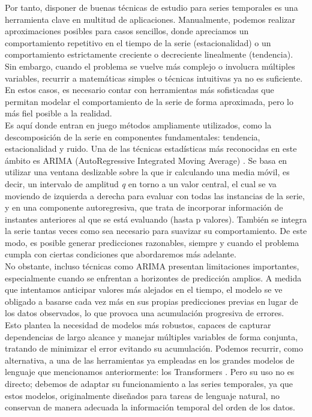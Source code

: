 Por tanto, disponer de buenas técnicas de estudio para series temporales es una herramienta clave en multitud de aplicaciones. Manualmente, podemos realizar aproximaciones posibles para casos sencillos, donde apreciamos un comportamiento repetitivo en el tiempo de la serie (estacionalidad) o un comportamiento estrictamente creciente o decreciente linealmente (tendencia). Sin embargo, cuando el problema se vuelve más complejo o involucra múltiples variables, recurrir a matemáticas simples o técnicas intuitivas ya no es suficiente. En estos casos, es necesario contar con herramientas más sofisticadas que permitan modelar el comportamiento de la serie de forma aproximada, pero lo más fiel posible a la realidad.\\

Es aquí donde entran en juego métodos ampliamente utilizados, como la descomposición de la serie en componentes fundamentales: tendencia, estacionalidad y ruido. Una de las técnicas estadísticas más reconocidas en este ámbito es ARIMA (AutoRegressive Integrated Moving Average) \cite{10.5555/574978}. Se basa en utilizar una ventana deslizable sobre la que ir calculando una media móvil, es decir, un intervalo de amplitud \textit{q} en torno a un valor central, el cual se va moviendo de izquierda a derecha para evaluar con todas las instancias de la serie, y en una componente autoregresiva, que trata de incorporar información de instantes anteriores al que se está evaluando (hasta p valores). También se integra la serie tantas veces como sea necesario para suavizar su comportamiento. De este modo, es posible generar predicciones razonables, siempre y cuando el problema cumpla con ciertas condiciones que abordaremos más adelante.\\

No obstante, incluso técnicas como ARIMA presentan limitaciones importantes, especialmente cuando se enfrentan a horizontes de predicción amplios. A medida que intentamos anticipar valores más alejados en el tiempo, el modelo se ve obligado a basarse cada vez más en sus propias predicciones previas en lugar de los datos observados, lo que provoca una acumulación progresiva de errores.\\

Esto plantea la necesidad de modelos más robustos, capaces de capturar dependencias de largo alcance y manejar múltiples variables de forma conjunta, tratando de minimizar el error evitando su acumulación. Podemos recurrir, como alternativa, a una de las herramientas ya empleadas en los grandes modelos de lenguaje que mencionamos anteriormente: los Transformers \cite{vaswani2023attentionneed}. Pero su uso no es directo; debemos de adaptar su funcionamiento a las series temporales, ya que estos modelos, originalmente diseñados para tareas de lenguaje natural, no conservan de manera adecuada la información temporal del orden de los datos.

